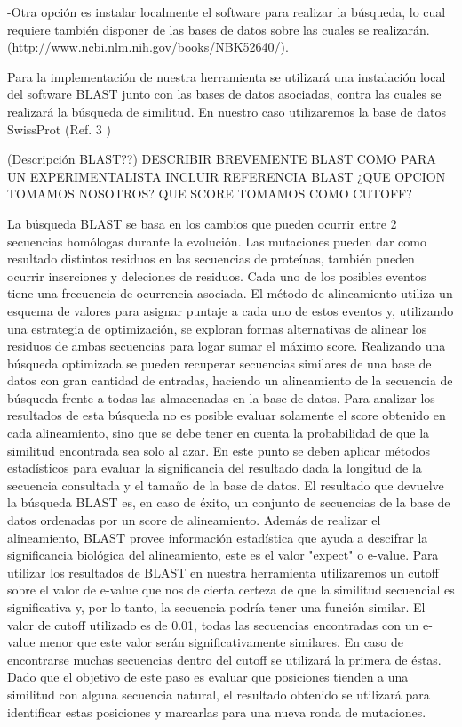     -Otra opción es instalar localmente el software para realizar la búsqueda, lo cual requiere también disponer de las bases de datos sobre las cuales se realizarán. (http://www.ncbi.nlm.nih.gov/books/NBK52640/).

Para la implementación de nuestra herramienta se utilizará una instalación local del software BLAST junto con las bases de datos asociadas, contra las cuales se realizará la búsqueda de similitud. En nuestro caso utilizaremos la base de datos SwissProt (Ref. 3 )

(Descripción BLAST??)
DESCRIBIR BREVEMENTE BLAST COMO PARA UN EXPERIMENTALISTA
INCLUIR REFERENCIA BLAST
¿QUE OPCION TOMAMOS NOSOTROS?
QUE SCORE TOMAMOS COMO CUTOFF?


La búsqueda BLAST se basa en los cambios que pueden ocurrir entre 2 secuencias homólogas durante la evolución. Las mutaciones pueden dar como resultado distintos residuos en las secuencias de proteínas, también pueden ocurrir inserciones y deleciones de residuos. Cada uno de los posibles eventos tiene una frecuencia de ocurrencia asociada. El método de alineamiento utiliza un esquema de valores para asignar puntaje a cada uno de estos eventos y,  utilizando una estrategia de optimización, se exploran formas alternativas de alinear los residuos de ambas secuencias para logar sumar el máximo score.
Realizando una búsqueda optimizada se pueden recuperar secuencias similares de una base de datos con gran cantidad de entradas, haciendo un alineamiento de la secuencia de búsqueda frente a todas las almacenadas en la base de datos. Para analizar los resultados de esta búsqueda no es posible evaluar solamente el score obtenido en cada alineamiento, sino que se debe tener en cuenta la probabilidad de que la similitud encontrada sea solo al azar. En este punto se deben aplicar métodos estadísticos para evaluar la significancia del resultado dada la longitud de la secuencia consultada y el tamaño de la base de datos.
El resultado que devuelve la búsqueda BLAST es, en caso de éxito, un conjunto de secuencias de la base de datos ordenadas por un score de alineamiento. Además de realizar el alineamiento, BLAST provee información estadística que ayuda a descifrar la significancia biológica del alineamiento, este es el valor "expect" o e-value. Para utilizar los resultados de BLAST en nuestra herramienta utilizaremos un cutoff sobre el valor de e-value que nos de cierta certeza de que la similitud secuencial es significativa y, por lo tanto, la secuencia podría tener una función similar. El valor de cutoff utilizado es de 0.01, todas las secuencias encontradas con un e-value menor que este valor serán significativamente similares. En caso de encontrarse muchas secuencias dentro del cutoff se utilizará la primera de éstas.
Dado que el objetivo de este paso es evaluar que posiciones tienden a una similitud con alguna secuencia natural, el resultado obtenido se utilizará para identificar estas posiciones y marcarlas para una nueva ronda de mutaciones.

